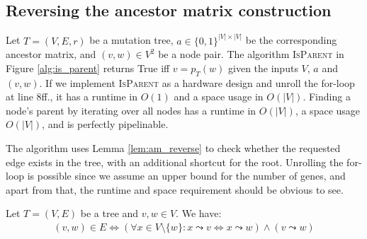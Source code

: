 \subsection{Reversing the ancestor matrix construction}

\begin{theorem}
    \label{theo:am_reverse}
    Let $T=(V, E, r)$ be a mutation tree, $a \in \{0, 1\}^{|V| \times |V|}$ be the corresponding ancestor matrix, and $(v, w) \in V^2$ be a node pair. The algorithm \textsc{IsParent} in Figure \ref{alg:is_parent} returns True iff $v = p_T(w)$ given the inputs $V$, $a$ and $(v,w)$. If we implement \textsc{IsParent} as a hardware design and unroll the for-loop at line 8ff., it has a runtime in $O(1)$ and a space usage in $O(|V|)$. Finding a node's parent by iterating over all nodes has a runtime in $O(|V|)$, a space usage $O(|V|)$, and is perfectly pipelinable.
\end{theorem}

The algorithm uses Lemma \ref{lem:am_reverse} to check whether the requested edge exists in the tree, with an additional shortcut for the root. Unrolling the for-loop is possible since we assume an upper bound for the number of genes, and apart from that, the runtime and space requirement should be obvious to see.

\begin{lemma}
    \label{lem:am_reverse}
    Let $T = (V, E)$ be a tree and $v, w \in V$. We have:
    \begin{align*}
        (v, w) \in E \Leftrightarrow (\forall x \in V \setminus \{w\}: x \leadsto v \Leftrightarrow x \leadsto w) \wedge (v \leadsto w)
    \end{align*}
\end{lemma}

